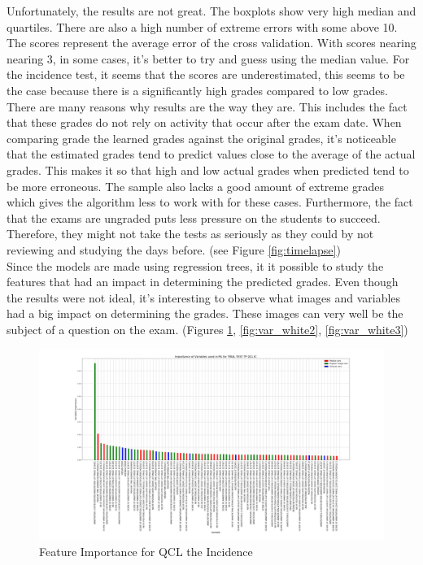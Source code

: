 \documentclass[a4paper,11pt]{report}
\numberwithin{figure}{section} %
\begin{document}
    Unfortunately, the results are not great.
    The boxplots show very high median and quartiles.
    There are also a high number of extreme errors with some above 10.
    The scores represent the average error of the cross validation.
    With scores nearing nearing 3, in some cases, it's better to try and guess using the median value.
    For the incidence test, it seems that the scores are underestimated, this seems to be the case because there is a significantly high grades compared to low grades.
    There are many reasons why results are the way they are.
    This includes the fact that these grades do not rely on activity that occur after the exam date.
    When comparing grade the learned grades against the original grades, it's noticeable that the estimated grades tend to predict values close to the average of the actual grades.
    This makes it so that high and low actual grades when predicted tend to be more erroneous.
    The sample also lacks a good amount of extreme grades which gives the algorithm less to work with for these cases.
    Furthermore, the fact that the exams are ungraded puts less pressure on the students to succeed.
    Therefore, they might not take the tests as seriously as they could by not reviewing and studying the days before. (see Figure \ref{fig:timelapse}) \\

  
  Since the models are made using regression trees, it it possible to study the features that had an impact in determining the predicted grades.
  Even though the results were not ideal, it's interesting to observe what images and variables had a big impact on determining the grades.
  These images can very well be the subject of a question on the exam. (Figures \ref{fig:var_white1}, \ref{fig:var_white2}, \ref{fig:var_white3})

     \begin{figure}[H]
      \centering
      \includegraphics[width=.95\linewidth]{plots/var_importance_TRIAL_TEST_TP_QCL_IC_2018-04-29_14_31_17.png}
      \caption{Feature Importance for QCL the Incidence}
      \label{fig:var_white1}
      \end{figure}
      
\end{document}
